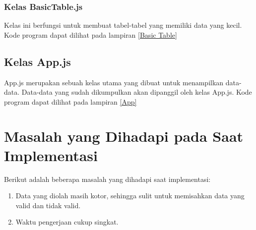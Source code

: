 \subsubsection{Kelas BasicTable.js}
Kelas ini berfungsi untuk membuat tabel-tabel yang memiliki data yang kecil. Kode program dapat dilihat pada lampiran \ref{Basic Table}


\subsection{Kelas App.js}
App.js merupakan sebuah kelas utama yang dibuat untuk menampilkan data-data. Data-data yang sudah dikumpulkan akan dipanggil oleh kelas App.js. Kode program dapat dilihat pada lampiran \ref{App}


\section{Masalah yang Dihadapi pada Saat Implementasi}
Berikut adalah beberapa masalah yang dihadapi saat implementasi:
\begin{enumerate}
	\item Data yang diolah masih kotor, sehingga sulit untuk memisahkan data yang valid dan tidak valid.
	\item Waktu pengerjaan cukup singkat.
\end{enumerate}






